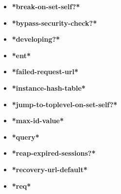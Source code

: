 \documentclass [11pt]{book}
\begin{document}
\begin{itemize}

\item {}
\label{prim:*break-on-set-self?*}
\textbf{*break-on-set-self?*}





\item {}
\label{prim:*bypass-security-check?*}
\textbf{*bypass-security-check?*}





\item {}
\label{prim:*developing?*}
\textbf{*developing?*}





\item {}
\label{prim:*ent*}
\textbf{*ent*}





\item {}
\label{prim:*failed-request-url*}
\textbf{*failed-request-url*}





\item {}
\label{prim:*instance-hash-table*}
\textbf{*instance-hash-table*}





\item {}
\label{prim:*jump-to-toplevel-on-set-self?*}
\textbf{*jump-to-toplevel-on-set-self?*}





\item {}
\label{prim:*max-id-value*}
\textbf{*max-id-value*}





\item {}
\label{prim:*query*}
\textbf{*query*}





\item {}
\label{prim:*reap-expired-sessions?*}
\textbf{*reap-expired-sessions?*}





\item {}
\label{prim:*recovery-url-default*}
\textbf{*recovery-url-default*}





\item {}
\label{prim:*req*}
\textbf{*req*}





\end{itemize}
\end{document}
